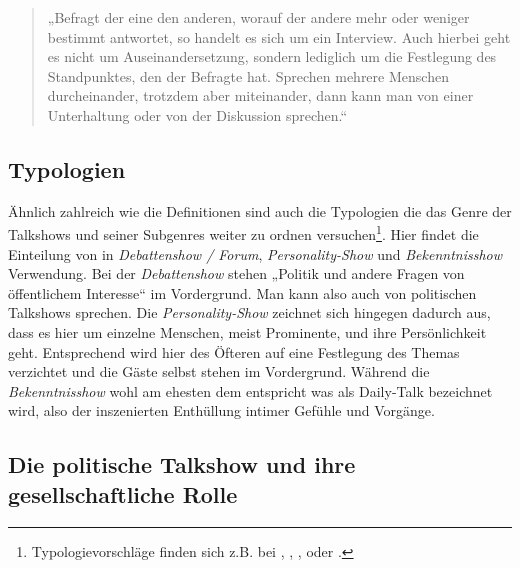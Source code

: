 \begin{quote}
	„Befragt der eine den anderen, worauf der andere mehr oder weniger bestimmt antwortet, so handelt es sich um ein Interview. Auch hierbei geht es nicht um Auseinandersetzung, sondern lediglich um die Festlegung des Standpunktes, den der Befragte hat. Sprechen mehrere Menschen durcheinander, trotzdem aber miteinander, dann kann man von einer Unterhaltung oder von der Diskussion sprechen.“
\end{quote}

\subsection{Typologien}\label{chap:typologien}

Ähnlich zahlreich wie die Definitionen sind auch die Typologien die das Genre der Talkshows und seiner Subgenres weiter zu ordnen versuchen\footnote{Typologievorschläge finden sich z.B. bei \textcite[387]{richardsonSpecificDebateFormats2008}, \textcite{timbergTaxonomyTelevisionTalk2002}, \textcite[20]{kellerGeschichteTalkshowDeutschland2009}, \textcite[602]{eimerenTalkshowsFormateUnd1998} oder \textcite[56]{tenscherTalkshowisierungAlsElement2002}.}. Hier findet die Einteilung von \parencite[32f.]{plakeTalkshowsIndustrialisierungKommunikation1999} in \textit{Debattenshow / Forum}, \textit{Personality-Show} und \textit{Bekenntnisshow} Verwendung. Bei der \textit{Debattenshow} stehen „Politik und andere Fragen von öffentlichem Interesse“  \parencite[32]{plakeTalkshowsIndustrialisierungKommunikation1999} im Vordergrund. Man kann also auch von politischen Talkshows sprechen. Die \textit{Personality-Show} zeichnet sich hingegen dadurch aus, dass es hier um einzelne Menschen, meist Prominente, und ihre Persönlichkeit geht. Entsprechend wird hier des Öfteren auf eine Festlegung des Themas verzichtet und die Gäste selbst stehen im Vordergrund. Während die \textit{Bekenntnisshow} wohl am ehesten dem entspricht was als Daily-Talk bezeichnet wird, also der inszenierten Enthüllung intimer Gefühle und Vorgänge.

\subsection{Die politische Talkshow und ihre gesellschaftliche Rolle}
\label{sec:polittalk_rolle}

